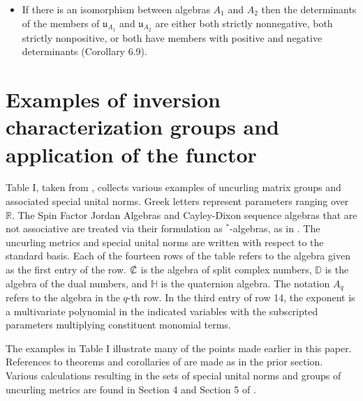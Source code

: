 \documentclass{amsart}
\numberwithin{equation}{section}
\theoremstyle{definition}
\numberwithin{theorem}{section}
\begin{document}
\begin{itemize}
\item If there is an isomorphism between algebras $A_1$ and $A_2$ then the determinants of the members of $\mathfrak{u}_{A_1}$ and $\mathfrak{u}_{A_2}$ are either  both strictly nonnegative, both strictly nonpositive, or both have members with positive and negative determinants (Corollary 6.9).
\end{itemize}
  

\section{Examples of inversion characterization groups and application of the functor}

Table I, taken from \cite{fgreensite:2023}, collects various examples of uncurling matrix groups and associated special unital norms.  Greek letters represent parameters ranging over $\mathbb{R}$.  The Spin Factor Jordan Algebras and Cayley-Dixon sequence algebras that are not associative are treated via their formulation as $^*$-algebras, as in \cite{fgreensite:2023}. The uncurling metrics and special unital norms are written with respect to the standard basis.  Each of the fourteen rows of the table refers to the algebra given as the first entry of the row.  $\slashed{\mathbb{C}}$ is the algebra of split complex numbers, $\mathbb{D}$ is the algebra of the dual numbers, and $\mathbb{H}$ is the quaternion algebra.  The notation $A_q$ refers to the algebra in the $q$-th row.  In the third entry of row 14, the exponent is a multivariate polynomial in the indicated variables with the subscripted parameters multiplying constituent monomial terms.

The examples in Table I illustrate many of the points made earlier in this paper.  References to theorems and corollaries of \cite{fgreensite:2023} are made as in the prior section.  Various calculations resulting in the sets of special unital norms and groups of uncurling metrics are found in Section 4 and Section 5 of \cite{fgreensite:2023}.
\end{document}
